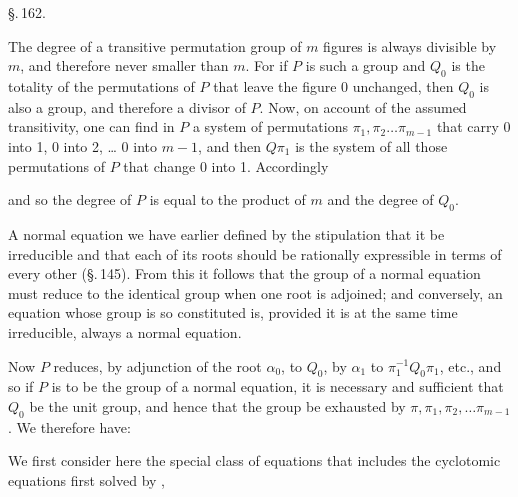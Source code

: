 
\begin{center}
\S.\,162.

\end{center}

The degree of a transitive permutation group of $m$ figures
is always divisible by $m$, and therefore never smaller than $m$.
For if $P$ is such a group and $Q_0$ is the totality of the permutations
of $P$ that leave the figure 0 unchanged, then $Q_0$ is also
a group, and therefore a divisor of $P$. Now, on account of the
assumed transitivity, one can find in $P$ a system of
permutations $\pi_1, \pi_2 \ldots \pi_{m-1}$ that carry 0 into 1, 0 into 2, \ldots
0 into $m-1$, and then $Q\pi_1$ is the system of all those
permutations of $P$ that change 0 into 1. Accordingly


and so the degree of $P$ is equal to the product of $m$ and the degree
of $Q_0$.


A normal equation we have earlier defined by the stipulation
that it be irreducible and that each of its
roots should be rationally expressible in terms of every other
(\S.\,145). From this it follows that the group of a normal equation
must reduce to the identical group when
one root is adjoined; and conversely, an equation
whose group is so constituted is, provided it is at the same time irreducible,
always a normal equation.

Now $P$ reduces, by adjunction of the root $\alpha_0$, to
$Q_0$, by $\alpha_1$ to $\pi_1^{-1}Q_0\pi_1$, etc., and so if $P$ is to be the group
of a normal equation, it is necessary and sufficient
that $Q_0$ be the unit group, and hence that the group be exhausted by
$\pi, \pi_1, \pi_2, \ldots \pi_{m-1}$. We therefore have:


We first consider here the special class of equations that includes
the cyclotomic equations first solved by ,
